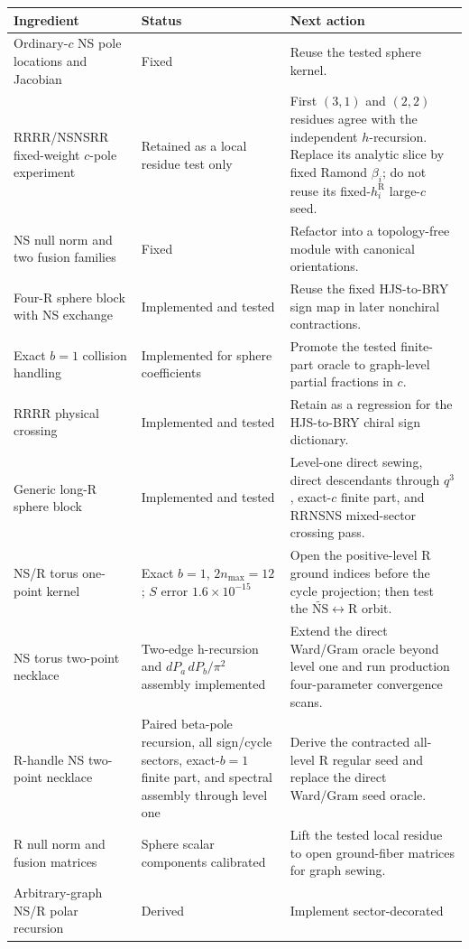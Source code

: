 \documentclass[11pt]{article}
\newcommand{\NS}{\mathrm{NS}}
\newcommand{\R}{\mathrm{R}}
\begin{document}
\begin{center}
\begin{tabularx}{\textwidth}{@{}L{0.30\textwidth}L{0.18\textwidth}X@{}}
\toprule
Ingredient & Status & Next action\\
\midrule
Ordinary-$c$ NS pole locations and Jacobian & Fixed & Reuse the tested sphere
kernel.\\
RRRR/NSNSRR fixed-weight \(c\)-pole experiment & Retained as a local
residue test only & First \((3,1)\) and \((2,2)\) residues agree with the
independent \(h\)-recursion.  Replace its analytic slice by fixed Ramond
\(\beta_i\); do not reuse its fixed-\(h_i^{\R}\) large-\(c\) seed.\\
NS null norm and two fusion families & Fixed & Refactor into a topology-free
module with canonical orientations.\\
Four-R sphere block with NS exchange & Implemented and tested & Reuse the
fixed HJS-to-BRY sign map in later nonchiral contractions.\\
Exact $b=1$ collision handling & Implemented for sphere coefficients &
Promote the tested finite-part oracle to graph-level partial fractions in
$c$.\\
RRRR physical crossing & Implemented and tested & Retain as a regression for
the HJS-to-BRY chiral sign dictionary.\\
Generic long-R sphere block & Implemented and tested & Level-one direct
sewing, direct descendants through $q^3$, exact-$c$ finite part, and RRNSNS
mixed-sector crossing pass.\\
NS/R torus one-point kernel & Exact $b=1$, $2n_{\max}=12$;
$S$ error $1.6\times10^{-15}$ & Open the positive-level R ground indices before the
cycle projection; then test the $\widetilde{\NS}\leftrightarrow\R$ orbit.\\
NS torus two-point necklace & Two-edge h-recursion and
$dP_a\,dP_b/\pi^2$ assembly implemented & Extend the direct Ward/Gram oracle
beyond level one and run production four-parameter convergence scans.\\
R-handle NS two-point necklace & Paired beta-pole recursion, all sign/cycle
sectors, exact-$b=1$ finite part, and spectral assembly through level one &
Derive the contracted all-level R regular seed and replace the direct
Ward/Gram seed oracle.\\
R null norm and fusion matrices & Sphere scalar components calibrated & Lift
the tested local residue to open ground-fiber matrices for graph sewing.\\
Arbitrary-graph NS/R polar recursion & Derived & Implement sector-decorated

\end{tabularx}
\end{center}
\end{document}
